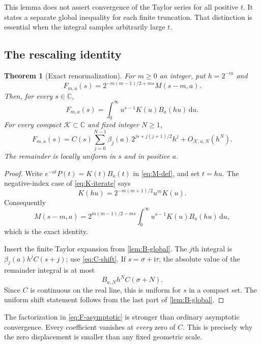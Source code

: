 \documentclass[11pt,a4paper]{article}
\numberwithin{equation}{section}
\newtheorem{theorem}{Theorem}[section]
\theoremstyle{definition}
\theoremstyle{remark}
\newcommand{\C}{\mathbb C}
\newcommand{\ii}{\mathrm i}
\newcommand{\dd}{\,\mathrm d}
\begin{document}
This lemma does not assert convergence of the Taylor series for all
positive $t$. It states a separate global inequality for each finite
truncation. That distinction is essential when the integral samples
arbitrarily large $t$.

\subsection{The rescaling identity}
\begin{theorem}[Exact renormalization]
\label{thm:rescaling}
For $m\ge0$ an integer, put $h=2^{-m}$ and
\begin{equation}
 F_{m,a}(s)=2^{-m(m-1)/2+ms}M(s-m,a).
 \label{eq:F-def}
\end{equation}
Then, for every $s\in\C$,
\begin{equation}
 \boxed{F_{m,a}(s)=\int_0^\infty u^{s-1}K(u)B_a(hu)\dd u.}
 \label{eq:F-exact}
\end{equation}
For every compact $\mathcal K\subset\C$ and fixed integer $N\ge1$,
\begin{equation}
 \boxed{
 F_{m,a}(s)=C(s)\sum_{j=0}^{N-1}
  \beta_j(a)\,2^{js+j(j+1)/2}h^j
  +O_{\mathcal K,a,N}(h^N).}
 \label{eq:F-asymptotic}
\end{equation}
The remainder is locally uniform in $s$ and in positive $a$.
\end{theorem}
\begin{proof}
Write $e^{-at}P(t)=K(t)B_a(t)$ in \cref{eq:M-def}, and set $t=hu$.
The negative-index case of \cref{eq:K-iterate} says
\[
 K(hu)=2^{-m(m+1)/2}u^mK(u).
\]
Consequently
\[
 M(s-m,a)=2^{m(m-1)/2-ms}
       \int_0^\infty u^{s-1}K(u)B_a(hu)\dd u,
\]
which is the exact identity.

Insert the finite Taylor expansion from \cref{lem:B-global}. The
$j$th integral is $\beta_j(a)h^jC(s+j)$; use
\cref{eq:C-shift}. If $s=\sigma+\ii\tau$, the absolute value of the
remainder integral is at most
\begin{equation}
 B_{a,N}h^N C(\sigma+N).
 \label{eq:F-remainder-explicit}
\end{equation}
Since $C$ is continuous on the real line, this is uniform for $s$ in
a compact set. The uniform shift statement follows from the last
part of \cref{lem:B-global}.
\end{proof}

The factorization in \cref{eq:F-asymptotic} is stronger than ordinary
asymptotic convergence. Every coefficient vanishes at \emph{every}
zero of $C$. This is precisely why the zero displacement is smaller
than any fixed geometric scale.
\end{document}
